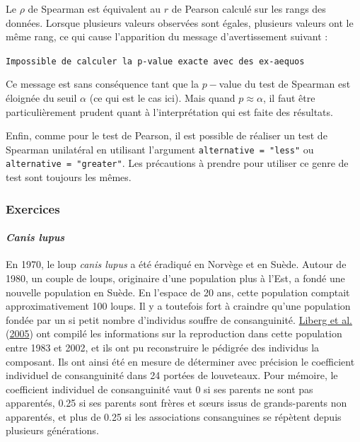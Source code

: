 \documentclass[
  a4paper,
]{article}
\begin{document}
Le \(\rho\) de Spearman est équivalent au \(r\) de Pearson calculé sur les rangs des données. Lorsque plusieurs valeurs observées sont égales, plusieurs valeurs ont le même rang, ce qui cause l'apparition du message d'avertissement suivant :

\texttt{Impossible\ de\ calculer\ la\ p-value\ exacte\ avec\ des\ ex-aequos}

Ce message est sans conséquence tant que la \(p-\)value du test de Spearman est éloignée du seuil \(\alpha\) (ce qui est le cas ici). Mais quand \(p \approx \alpha\), il faut être particulièrement prudent quant à l'interprétation qui est faite des résultats.

Enfin, comme pour le test de Pearson, il est possible de réaliser un test de Spearman unilatéral en utilisant l'argument \texttt{alternative\ =\ "less"} ou \texttt{alternative\ =\ "greater"}. Les précautions à prendre pour utiliser ce genre de test sont toujours les mêmes.

\hypertarget{exercices}{%
\subsubsection{Exercices}\label{exercices}}

\hypertarget{canis-lupus}{%
\paragraph{\texorpdfstring{\emph{Canis lupus}}{Canis lupus}}\label{canis-lupus}}

En 1970, le loup \emph{canis lupus} a été éradiqué en Norvège et en Suède. Autour de 1980, un couple de loups, originaire d'une population plus à l'Est, a fondé une nouvelle population en Suède. En l'espace de 20 ans, cette population comptait approximativement 100 loups. Il y a toutefois fort à craindre qu'une population fondée par un si petit nombre d'individus souffre de consanguinité. \protect\hyperlink{ref-liberg2005}{Liberg et al.} (\protect\hyperlink{ref-liberg2005}{2005}) ont compilé les informations sur la reproduction dans cette population entre 1983 et 2002, et ils ont pu reconstruire le pédigrée des individus la composant. Ils ont ainsi été en mesure de déterminer avec précision le coefficient individuel de consanguinité dans 24 portées de louveteaux.
Pour mémoire, le coefficient individuel de consanguinité vaut 0 si ses parents ne sont pas apparentés, 0.25 si ses parents sont frères et sœurs issus de grands-parents non apparentés, et plus de 0.25 si les associations consanguines se répètent depuis plusieurs générations.
\end{document}
